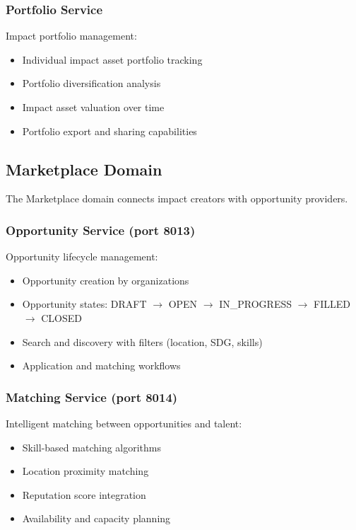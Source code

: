 \documentclass[11pt,a4paper]{article}
\begin{document}
\subsubsection{Portfolio Service}

Impact portfolio management:
\begin{itemize}
  \item Individual impact asset portfolio tracking
  \item Portfolio diversification analysis
  \item Impact asset valuation over time
  \item Portfolio export and sharing capabilities
\end{itemize}

\subsection{Marketplace Domain}

The Marketplace domain connects impact creators with opportunity providers.

\subsubsection{Opportunity Service (port 8013)}

Opportunity lifecycle management:
\begin{itemize}
  \item Opportunity creation by organizations
  \item Opportunity states: DRAFT $\rightarrow$ OPEN $\rightarrow$ IN\_PROGRESS $\rightarrow$ FILLED $\rightarrow$ CLOSED
  \item Search and discovery with filters (location, SDG, skills)
  \item Application and matching workflows
\end{itemize}

\subsubsection{Matching Service (port 8014)}

Intelligent matching between opportunities and talent:
\begin{itemize}
  \item Skill-based matching algorithms
  \item Location proximity matching
  \item Reputation score integration
  \item Availability and capacity planning
\end{itemize}
\end{document}
